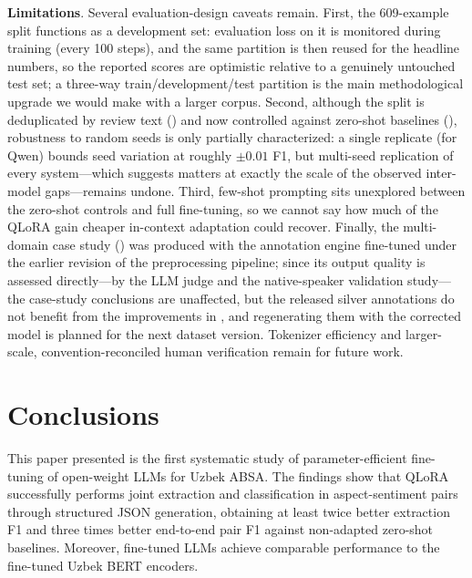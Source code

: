 \documentclass[bdcc,article,submit,moreauthors]{Definitions/mdpi}
\begin{document}
\textbf{Limitations}. Several evaluation-design caveats remain. First, the 609-example split functions as a development set: evaluation loss on it is monitored during training (every 100 steps), and the same partition is then reused for the headline numbers, so the reported scores are optimistic relative to a genuinely untouched test set; a three-way train/development/test partition is the main methodological upgrade we would make with a larger corpus. Second, although the split is deduplicated by review text () and now controlled against zero-shot baselines (), robustness to random seeds is only partially characterized: a single replicate (for Qwen) bounds seed variation at roughly $\pm 0.01$ F1, but multi-seed replication of every system---which  suggests matters at exactly the scale of the observed inter-model gaps---remains undone. Third, few-shot prompting sits unexplored between the zero-shot controls and full fine-tuning, so we cannot say how much of the QLoRA gain cheaper in-context adaptation could recover. Finally, the multi-domain case study () was produced with the annotation engine fine-tuned under the earlier revision of the preprocessing pipeline; since its output quality is assessed directly---by the LLM judge and the native-speaker validation study---the case-study conclusions are unaffected, but the released silver annotations do not benefit from the improvements in , and regenerating them with the corrected model is planned for the next dataset version. Tokenizer efficiency and larger-scale, convention-reconciled human verification remain for future work.



\section{Conclusions}
\label{sec:conclusion}
This paper presented is the first systematic study of parameter-efficient fine-tuning of open-weight LLMs for Uzbek ABSA. The findings show that QLoRA successfully performs joint extraction and classification in aspect-sentiment pairs through structured JSON generation, obtaining at least twice better extraction F1 and three times better end-to-end pair F1 against non-adapted zero-shot baselines. Moreover, fine-tuned LLMs achieve comparable performance to the fine-tuned Uzbek BERT encoders. 
\end{document}

